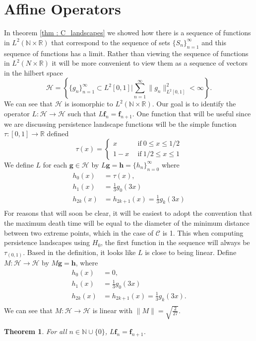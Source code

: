 \documentclass [52pt] {article}
\newcommand{\R}{\mathbb{R}}
\newcommand{\N}{\mathbb{N}}
\newcommand{\Hil}{\mathcal{H}}
\newtheorem{theorem}{Theorem}
\begin{document}
\section{Affine Operators}

In theorem \ref{thm : C_landscapes} we showed how there is a sequence of functions in $L^2(\N\times\R)$ that correspond to the sequence of sets $\{S_n\}_{n=1}^\infty$ and this sequence of functions has a limit.  Rather than viewing the sequence of functions in $L^2(N\times\R)$ it will be more convenient to view them as a sequence of vectors in the hilbert space
\[ \Hil = \left\{\{g_n\}_{n=1}^\infty \subset L^2[0,1]\bigg| \sum_{n=1}^\infty \|g_n\|_{L^2[0,1]}^2 <\infty\right\}.\]
We can see that $\Hil$ is isomorphic to $L^2(\N\times\R)$.  Our goal is to identify the operator $L:\Hil \to \Hil$ such that $L\mathbf{f}_n = \mathbf{f}_{n+1}$.  One function that will be useful since we are discussing persistence landscape functions will be the simple function $\tau:[0,1] \to\R$ defined
\[\tau(x) = \begin{cases}
x &\:\:\text{if}\:0\le x\le 1/2\\
1-x &\:\:\text{if}\:1/2\le x\le 1
\end{cases}\]
We define $L$ for each $\mathbf{g}\in \Hil$ by 
$L\mathbf{g} = \mathbf{h} = \{h_n\}_{n=0}^\infty$ where
\[\begin{split}
h_0(x) &= \tau(x),\\
h_1(x) &= \frac{1}{3}g_0(3x)\\
h_{2k}(x)&=h_{2k +1}(x) = \frac{1}{3}g_k(3x)\\
\end{split}\]
For reasons that will soon be clear, it will be easiest to adopt the convention that the maximum death time will be equal to the diameter of the minimum distance between two extreme points, which in the case of $\mathcal{C}$ is 1.  This when computing persistence landscapes using $H_0$, the first function in the sequence will always be $\tau_{(0,1)}$.  Based in the definition, it looks like $L$ is close to being linear.  Define $M:\Hil\to\Hil$ by $M\mathbf{g} = \mathbf{h}$, where
\[\begin{split}
h_0(x) &= 0,\\
h_1(x) &= \frac{1}{3}g_0(3x)\\
h_{2k}(x)&=h_{2k +1}(x) = \frac{1}{3}g_k(3x).\\
\end{split}\]
We can see that $M:\Hil\to\Hil$ is linear with $\|M\| = \sqrt{\frac{2}{27}}$.  
\begin{theorem} For all $n\in\N\cup\{0\}$, $L\mathbf{f}_n = \mathbf{f}_{n+1}$.
\end{theorem}
\end{document}
